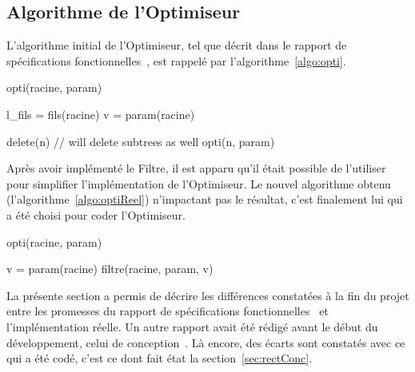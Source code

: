 \subsection{Algorithme de l'Optimiseur}
\label{ssec:algoOptim}

    L'algorithme initial de l'Optimiseur, tel que décrit dans le rapport de spécifications fonctionnelles~\cite{spec_fonc}, est rappelé par l'{\sc algorithme}~\ref{algo:opti}.

         \begin{algorithm}[H]
            \caption{opti(racine, param)}
            \label{algo:opti}
            \begin{algorithmic}
                \STATE l\_fils = fils(racine)
                    \RETURN
                \ENDIF
                \STATE
                    \STATE v = param(racine)

                            \STATE delete(n) // will delete subtrees as well
                        \ENDIF
                    \ENDFOR
                \ENDIF
                \STATE
                    \STATE opti(n, param)
                \ENDFOR
            \end{algorithmic}
        \end{algorithm}

Après avoir implémenté le Filtre, il est apparu qu'il était possible de l'utiliser pour simplifier l'implémentation de l'Optimiseur. Le nouvel algorithme obtenu (l'{\sc algorithme}~\ref{algo:optiReel}) n'impactant pas le résultat, c'est finalement lui qui a été choisi pour coder l'Optimiseur.

	\begin{algorithm}[H]
            \caption{opti(racine, param)}
            \label{algo:optiReel}
            \begin{algorithmic}
		\STATE v = param(racine)
		\STATE filtre(racine, param, v)
            \end{algorithmic}
        \end{algorithm}

    La présente section a permis de décrire les différences constatées à la fin du projet entre les promesses du rapport de spécifications fonctionnelles~\cite{spec_fonc} et l'implémentation réelle. Un autre rapport avait été rédigé avant le début du développement, celui de conception~\cite{conception}. Là encore, des écarts sont constatés avec ce qui a été codé, c'est ce dont fait état la {\sc section}~\ref{sec:rectConc}. 

